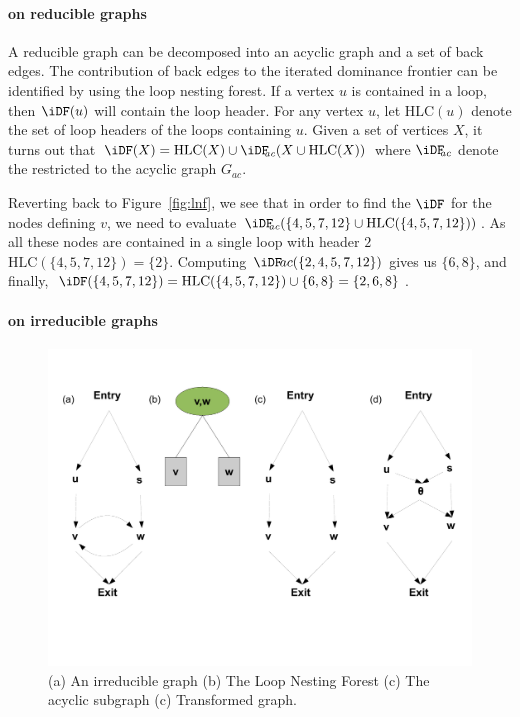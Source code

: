 {\paragraph{\iDF on reducible graphs}

{\def\HLC{\mbox{HLC}}
A reducible graph can be decomposed into an acyclic graph and a set of back 
edges. The contribution of back edges to the iterated dominance frontier can be 
identified by using the loop nesting forest. If a vertex $u$ is contained in a 
loop, then $\iDF(u)$ will contain the loop header. For any vertex $u$, let 
$\HLC(u)$ denote the set of loop headers of the loops containing $u$. Given a 
set of vertices $X$, it turns out that $\iDF(X) = \HLC(X) \cup 
\iDFac(X \cup 
\HLC(X))$ where $\iDFac$ denote the \iDF restricted to the 
acyclic graph $G_{\textit{ac}}$.

Reverting back 
to Figure~\ref{fig:lnf}, we see that in order to find the $\iDF$ for the nodes 
defining $v$, we need to evaluate $\iDFac(\{4,5,7,12\} \cup 
\HLC(\{4,5,7,12\}))$. As all these nodes are contained in a single loop with 
header $2$ $\HLC(\{4,5,7,12\}) = \{2\}$.
Computing $\iDF\!ac(\{2,4,5,7,12\})$ gives us $\{6,8\}$, and finally, 
$\iDF(\{4,5,7,12\}) = \HLC(\{4,5,7,12\}) \cup \{6,8\} = \{2,6,8\}$.  
}

\paragraph{\iDF on irreducible graphs}

\begin{figure}[t]
  \centerline{\includegraphics[scale=0.3]{irred.pdf}}
  \caption{(a) An irreducible graph (b) The Loop Nesting Forest (c) The acyclic subgraph (c) Transformed
  graph.}
  \label{fig:irred}
\end{figure} 



}
